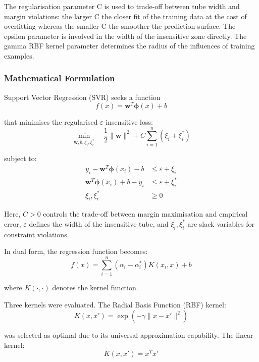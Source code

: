 \documentclass[pdflatex,sn-mathphys-num]{sn-jnl}
\begin{document}
The regularisation parameter C is used to trade-off between tube width and margin violations: the larger C the closer fit of the training data at the cost of overfitting whereas the smaller C the smoother the prediction surface. The epsilon parameter is involved in the width of the insensitive zone directly. The gamma RBF kernel parameter determines the radius of the influences of training examples.

\subsubsection{Mathematical Formulation}
Support Vector Regression (SVR) seeks a function
\begin{equation}
f(x) = \mathbf{w}^T \boldsymbol{\phi}(x) + b
\end{equation}

that minimises the regularised $\varepsilon$-insensitive loss:
\begin{equation}
\min_{\mathbf{w}, b, \xi_i, \xi_i^*} \quad
\frac{1}{2} \|\mathbf{w}\|^2 + C \sum_{i=1}^{n} (\xi_i + \xi_i^*)
\end{equation}

subject to:
\begin{align}
y_i - \mathbf{w}^T \boldsymbol{\phi}(x_i) - b &\leq \varepsilon + \xi_i \\
\mathbf{w}^T \boldsymbol{\phi}(x_i) + b - y_i &\leq \varepsilon + \xi_i^* \\
\xi_i, \xi_i^* &\geq 0
\end{align}

Here, $C > 0$ controls the trade-off between margin maximisation and empirical error,
$\varepsilon$ defines the width of the insensitive tube, and $\xi_i, \xi_i^*$ are slack variables for constraint violations.

In dual form, the regression function becomes:
\begin{equation}
f(x) = \sum_{i=1}^{n} (\alpha_i - \alpha_i^*) K(x_i, x) + b
\end{equation}

where $K(\cdot, \cdot)$ denotes the kernel function.

Three kernels were evaluated. The Radial Basis Function (RBF) kernel:
\begin{equation}
K(x, x') = \exp(-\gamma \|x - x'\|^2)
\end{equation}

was selected as optimal due to its universal approximation capability. The linear kernel:
\begin{equation}
K(x, x') = x^T x'
\end{equation}
\end{document}

